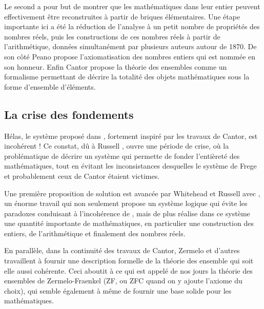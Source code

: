 Le second a pour but de montrer que les mathématiques dans leur entier peuvent
effectivement être reconstruites à partir de briques élémentaires. Une étape
importante ici a été la réduction de l’analyse à un petit nombre de propriétés
des nombres réels, puis les constructions de ces nombres réels à partir
de l’arithmétique, données simultanément par plusieurs auteurs autour de 1870. De son côté Peano \cite{PeanoAxioms} propose
l’axiomatisation des nombres entiers qui est nommée en son honneur.
Enfin Cantor \cite{??}
propose la théorie des ensembles comme un formalisme permettant
de décrire la totalité des objets mathématiques sous la forme d’ensemble
d’éléments.

\subsection{La crise des fondements}
Hélas, le système proposé dans \cite{Begriffsschrift}, fortement inspiré par
les travaux de Cantor, est incohérent !
Ce constat, dû à Russell \cite{Begriffsschrift},
ouvre une période de crise, où la problématique de décrire un système qui permette
de fonder l’entièreté des mathématiques,
tout en évitant les inconsistances desquelles
le système de Frege et probablement ceux de Cantor étaient victimes.

Une première proposition de solution est avancée par Whitehead et Russell
avec \cite{Principia}, un énorme travail qui non seulement propose un système
logique qui évite les paradoxes conduisant à l’incohérence de
\cite{Begriffsschrift}, mais de plus réalise dans ce système une quantité importante
de mathématiques, en particulier une construction des entiers, de l’arithmétique et
finalement des nombres réels.

En parallèle, dans la continuité des travaux de Cantor, Zermelo \cite{Zermelo1905} et
d’autres travaillent à fournir une description formelle de la théorie des ensemble
qui soit elle aussi cohérente. Ceci aboutit à ce qui est appelé de nos jours la
théorie des ensembles de Zermelo-Fraenkel (ZF, ou ZFC quand on y ajoute l’axiome
du choix), qui semble également à même de fournir une base solide pour les
mathématiques.

